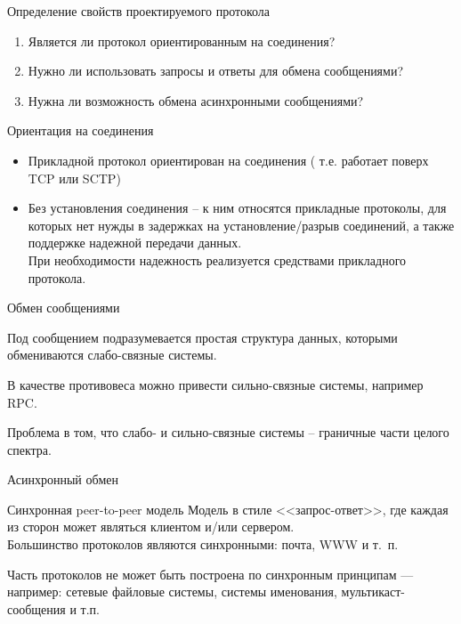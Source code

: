 \begin{frame}{Определение свойств проектируемого протокола}

	\begin{enumerate}
		\item Является ли протокол ориентированным на соединения?
			\pause
		\item Нужно ли использовать запросы и ответы для обмена сообщениями?
			\pause
		\item Нужна ли возможность обмена асинхронными сообщениями?
	\end{enumerate}
\end{frame}

\begin{frame}{Ориентация на соединения}

	\begin{itemize}
		\item Прикладной протокол ориентирован на соединения ( т.е. работает поверх TCP или SCTP)
		\item Без установления соединения -- к ним относятся прикладные протоколы,  для которых нет нужды в задержках на установление/разрыв соединений,  а также поддержке надежной передачи данных.\\
			При необходимости надежность реализуется средствами прикладного протокола.
	\end{itemize}
\end{frame}


\begin{frame}{Обмен сообщениями}

	Под сообщением подразумевается простая структура данных,  которыми обмениваются слабо-связные системы.

	В качестве противовеса можно привести сильно-связные системы,  например RPC.

	Проблема в том,  что слабо- и сильно-связные системы -- граничные части целого спектра.
\end{frame}

\begin{frame}{Асинхронный обмен}

	\begin{block}{Синхронная peer-to-peer модель}
		Модель в стиле <<запрос-ответ>>,  где каждая из сторон может являться клиентом и/или сервером.\\
	Большинство протоколов являются синхронными: почта,  WWW и т. п.
	\end{block}

	Часть протоколов не может быть построена по синхронным принципам — например: сетевые файловые системы,  системы именования,  мультикаст-сообщения и т.п.
\end{frame}

